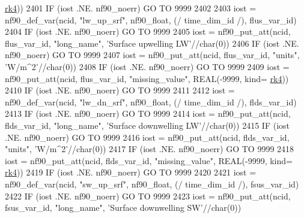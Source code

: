 \begin{DoxyCode}
{{{{{{      \hyperlink{namespaceportable_abaed22a509442771d3fba69bebda0b33}{rk4}))
2401     \textcolor{keywordflow}{IF} (iost .NE. nf90\_noerr) \textcolor{keywordflow}{GO TO} 9999
2402 
2403     iost    = nf90\_def\_var(ncid, \textcolor{stringliteral}{"lw\_up\_srf"}, nf90\_float, (/ time\_dim\_id /), flus\_var\_id)
2404     \textcolor{keywordflow}{IF} (iost .NE. nf90\_noerr) \textcolor{keywordflow}{GO TO} 9999
2405     iost    = nf90\_put\_att(ncid, flus\_var\_id, \textcolor{stringliteral}{"long\_name"}, \textcolor{stringliteral}{'Surface upwelling LW'}//char(0))
2406     \textcolor{keywordflow}{IF} (iost .NE. nf90\_noerr) \textcolor{keywordflow}{GO TO} 9999
2407     iost    = nf90\_put\_att(ncid, flus\_var\_id, \textcolor{stringliteral}{"units"}, \textcolor{stringliteral}{'W/m^2'}//char(0))
2408     \textcolor{keywordflow}{IF} (iost .NE. nf90\_noerr) \textcolor{keywordflow}{GO TO} 9999
2409     iost    = nf90\_put\_att(ncid, flus\_var\_id, \textcolor{stringliteral}{"missing\_value"}, \textcolor{keywordtype}{REAL}(-9999, kind=
      \hyperlink{namespaceportable_abaed22a509442771d3fba69bebda0b33}{rk4}))
2410     \textcolor{keywordflow}{IF} (iost .NE. nf90\_noerr) \textcolor{keywordflow}{GO TO} 9999
2411 
2412     iost    = nf90\_def\_var(ncid, \textcolor{stringliteral}{"lw\_dn\_srf"}, nf90\_float, (/ time\_dim\_id /), flds\_var\_id)
2413     \textcolor{keywordflow}{IF} (iost .NE. nf90\_noerr) \textcolor{keywordflow}{GO TO} 9999
2414     iost    = nf90\_put\_att(ncid, flds\_var\_id, \textcolor{stringliteral}{"long\_name"}, \textcolor{stringliteral}{'Surface downwelling LW'}//char(0))
2415     \textcolor{keywordflow}{IF} (iost .NE. nf90\_noerr) \textcolor{keywordflow}{GO TO} 9999
2416     iost    = nf90\_put\_att(ncid, flds\_var\_id, \textcolor{stringliteral}{"units"}, \textcolor{stringliteral}{'W/m^2'}//char(0))
2417     \textcolor{keywordflow}{IF} (iost .NE. nf90\_noerr) \textcolor{keywordflow}{GO TO} 9999
2418     iost    = nf90\_put\_att(ncid, flds\_var\_id, \textcolor{stringliteral}{"missing\_value"}, \textcolor{keywordtype}{REAL}(-9999, kind=
      \hyperlink{namespaceportable_abaed22a509442771d3fba69bebda0b33}{rk4}))
2419     \textcolor{keywordflow}{IF} (iost .NE. nf90\_noerr) \textcolor{keywordflow}{GO TO} 9999
2420 
2421     iost    = nf90\_def\_var(ncid, \textcolor{stringliteral}{"sw\_up\_srf"}, nf90\_float, (/ time\_dim\_id /), fsus\_var\_id)
2422     \textcolor{keywordflow}{IF} (iost .NE. nf90\_noerr) \textcolor{keywordflow}{GO TO} 9999
2423     iost    = nf90\_put\_att(ncid, fsus\_var\_id, \textcolor{stringliteral}{"long\_name"}, \textcolor{stringliteral}{'Surface downwelling SW'}//char(0))
}}}}}}
\end{DoxyCode}
